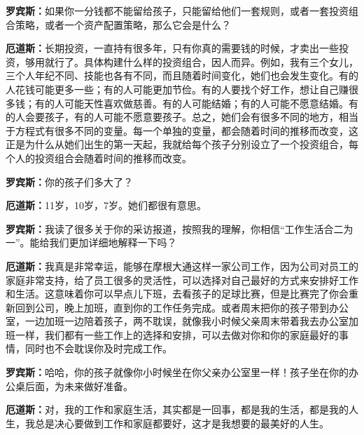 \begin{BookQuote}
\textbf{罗宾斯：}如果你一分钱都不能留给孩子，只能留给他们一套规则，或者一套投资组合策略，或者一个资产配置策略，那么它会是什么？
\end{BookQuote}

\begin{BookQuote}
\textbf{厄道斯：}长期投资，一直持有很多年，只有你真的需要钱的时候，才卖出一些投资，够用就行了。具体构建什么样的投资组合，因人而异。例如，我有三个女儿，三个人年纪不同、技能也各有不同，而且随着时间变化，她们也会发生变化。有的人花钱可能更多一些；有的人可能更加节俭。有的人要找个好工作，想让自己赚很多钱；有的人可能天性喜欢做慈善。有的人可能结婚；有的人可能不愿意结婚。有的人会要孩子，有的人可能不愿意要孩子。总之，她们会有很多不同的地方，相当于方程式有很多不同的变量。每一个单独的变量，都会随着时间的推移而改变，这正是为什么从她们出生的第一天起，我就给每个孩子分别设立了一个投资组合，每个人的投资组合会随着时间的推移而改变。
\end{BookQuote}

\begin{BookQuote}
\textbf{罗宾斯：}你的孩子们多大了？
\end{BookQuote}

\begin{BookQuote}
\textbf{厄道斯：}11岁，10岁，7岁。她们都很有意思。
\end{BookQuote}

\begin{BookQuote}
\textbf{罗宾斯：}我读了很多关于你的采访报道，按照我的理解，你相信“工作生活合二为一”。能给我们更加详细地解释一下吗？
\end{BookQuote}

\begin{BookQuote}
\textbf{厄道斯：}我真是非常幸运，能够在摩根大通这样一家公司工作，因为公司对员工的家庭非常支持，给了员工很多的灵活性，可以选择对自己最好的方式来安排好工作和生活。这意味着你可以早点儿下班，去看孩子的足球比赛，但是比赛完了你会重新回到公司，晚上加班，直到你的工作任务完成。或者周末把你的孩子带到办公室，一边加班一边陪着孩子，两不耽误，就像我小时候父亲周末带着我去办公室加班一样，我们都有一些工作上的选择和安排，可以去做对你和你的家庭最好的事情，同时也不会耽误你及时完成工作。
\end{BookQuote}

\begin{BookQuote}
\textbf{罗宾斯：}哈哈，你的孩子就像你小时候坐在你父亲办公室里一样！孩子坐在你的办公桌后面，为未来做好准备。
\end{BookQuote}

\begin{BookQuote}
\textbf{厄道斯：}对，我的工作和家庭生活，其实都是一回事，都是我的生活，都是我的人生，我总是决心要做到工作和家庭都要好，这才是我想要的最美好的人生。
\end{BookQuote}
